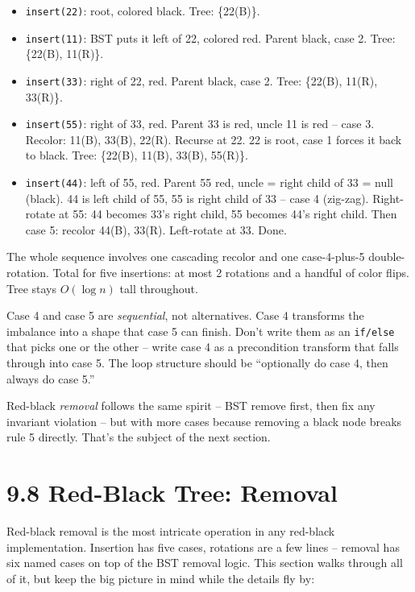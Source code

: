 \documentclass[11pt]{article}
\begin{document}
\begin{itemize}[leftmargin=*]
    \item \texttt{insert(22)}: root, colored black. Tree: \{22(B)\}.
    \item \texttt{insert(11)}: BST puts it left of 22, colored red. Parent black, case 2. Tree: \{22(B), 11(R)\}.
    \item \texttt{insert(33)}: right of 22, red. Parent black, case 2. Tree: \{22(B), 11(R), 33(R)\}.
    \item \texttt{insert(55)}: right of 33, red. Parent 33 is red, uncle 11 is red -- case 3. Recolor: 11(B), 33(B), 22(R). Recurse at 22. 22 is root, case 1 forces it back to black. Tree: \{22(B), 11(B), 33(B), 55(R)\}.
    \item \texttt{insert(44)}: left of 55, red. Parent 55 red, uncle = right child of 33 = null (black). 44 is left child of 55, 55 is right child of 33 -- case 4 (zig-zag). Right-rotate at 55: 44 becomes 33's right child, 55 becomes 44's right child. Then case 5: recolor 44(B), 33(R). Left-rotate at 33. Done.
\end{itemize}

The whole sequence involves one cascading recolor and one case-4-plus-5 double-rotation. Total for five insertions: at most 2 rotations and a handful of color flips. Tree stays $O(\log n)$ tall throughout.

\begin{warnbox}
Case 4 and case 5 are \emph{sequential}, not alternatives. Case 4 transforms the imbalance into a shape that case 5 can finish. Don't write them as an \texttt{if/else} that picks one or the other -- write case 4 as a precondition transform that falls through into case 5. The loop structure should be ``optionally do case 4, then always do case 5.''
\end{warnbox}

\begin{notebox}
Red-black \emph{removal} follows the same spirit -- BST remove first, then fix any invariant violation -- but with more cases because removing a black node breaks rule 5 directly. That's the subject of the next section.
\end{notebox}

\section{9.8 Red-Black Tree: Removal}

Red-black removal is the most intricate operation in any red-black implementation. Insertion has five cases, rotations are a few lines -- removal has six named cases on top of the BST removal logic. This section walks through all of it, but keep the big picture in mind while the details fly by:
\end{document}
